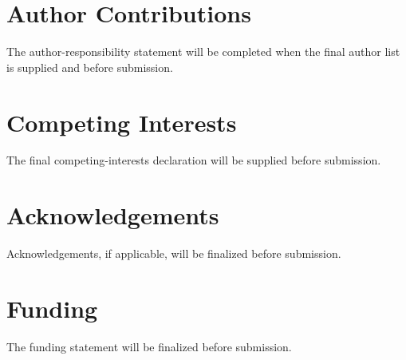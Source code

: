 \documentclass[10pt]{article}
\begin{document}
\section*{Author Contributions}

The author-responsibility statement will be completed when the final author list is supplied and before submission.

\section*{Competing Interests}

The final competing-interests declaration will be supplied before submission.

\section*{Acknowledgements}

Acknowledgements, if applicable, will be finalized before submission.

\section*{Funding}

The funding statement will be finalized before submission.
\end{document}
